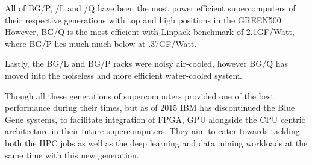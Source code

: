 \documentclass[a4paper,12 pt]{article}
\begin{document}
All of BG/P, /L and /Q have been the most power efficient supercomputers of their respective generations with top and high positions in the GREEN500. However, BG/Q is the most efficient with Linpack benchmark of 2.1GF/Watt, where BG/P lies much much below at .37GF/Watt.

Lastly, the BG/L and BG/P racks were noisy air-cooled, however BG/Q has moved into the noiseless and more efficient water-cooled system. 

Though all these generations of supercomputers provided one of the best performance during their times, but as of 2015 IBM has discontinued the Blue Gene systems, to facilitate integration of FPGA, GPU alongside the CPU centric architecture in their future supercomputers. They aim to cater towards tackling both the HPC jobs as well as the deep learning and data mining workloads at the same time with this new generation. 
\end{document}
